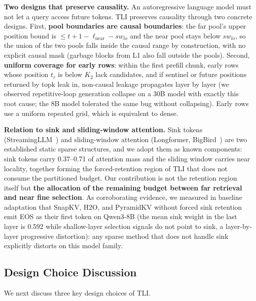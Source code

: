 \documentclass[11pt]{article}
\begin{document}
\textbf{Two designs that preserve causality.} An autoregressive language model must not let a query access future tokens. TLI preserves causality through two concrete designs. First, \textbf{pool boundaries are causal boundaries}: the far pool's upper position bound is $\leq t+1-\ell_{\mathrm{near}}-sw_{lo}$ and the near pool stays below $sw_{lo}$, so the union of the two pools falls inside the causal range by construction, with no explicit causal mask (garbage blocks from L1 also fall outside the pools). Second, \textbf{uniform coverage for early rows}: within the first prefill chunk, early rows whose position $t_r$ is below $K_2$ lack candidates, and if sentinel or future positions returned by topk leak in, non-causal leakage propagates layer by layer (we observed repetitive-loop generation collapse on a 30B model with exactly this root cause; the 8B model tolerated the same bug without collapsing). Early rows use a uniform repeated grid, which is equivalent to dense.

\textbf{Relation to sink and sliding-window attention.} Sink tokens (StreamingLLM~\cite{streamingllm}) and sliding-window attention (Longformer, BigBird~\cite{longformer,bigbird}) are two established static sparse structures, and we adopt them as known components: sink tokens carry 0.37--0.71 of attention mass and the sliding window carries near locality, together forming the forced-retention region of TLI that does not consume the partitioned budget. Our contribution is not the retention region itself but \textbf{the allocation of the remaining budget between far retrieval and near fine selection}. As corroborating evidence, we measured in baseline adaptation that SnapKV, H2O, and PyramidKV without forced sink retention emit EOS as their first token on Qwen3-8B (the mean sink weight in the last layer is 0.592 while shallow-layer selection signals do not point to sink, a layer-by-layer progressive distortion): any sparse method that does not handle sink explicitly distorts on this model family.

\subsection{Design Choice Discussion}

We next discuss three key design choices of TLI.
\end{document}
